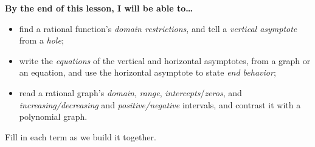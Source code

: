 \documentclass[10pt]{article}
\begin{document}
\namedateperiod

\vspace{0.08in}

\begin{objectivebox}
\textbf{By the end of this lesson, I will be able to\dots}
\begin{itemize}\setlength{\itemsep}{2pt}
  \item find a rational function's \emph{domain restrictions}, and tell a \emph{vertical asymptote} from a \emph{hole};
  \item write the \emph{equations} of the vertical and horizontal asymptotes, from a graph or an equation, and use the horizontal asymptote to state \emph{end behavior};
  \item read a rational graph's \emph{domain}, \emph{range}, \emph{intercepts}/\emph{zeros}, and \emph{increasing/decreasing} and \emph{positive/negative} intervals, and contrast it with a polynomial graph.
\end{itemize}
\end{objectivebox}

\vspace{0.05in}

\begin{vocabbox}
\small
Fill in each term as we build it together.
\par\vspace{2pt}   %
\end{vocabbox}
\end{document}
